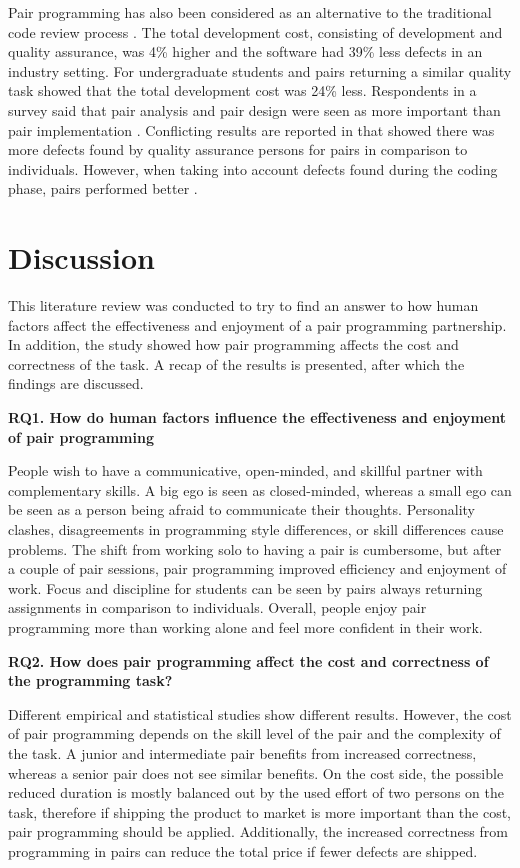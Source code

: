 \documentclass[conference]{IEEEtran}
\begin{document}
Pair programming has also been considered as an alternative to the traditional code review process \cite{10.1145/1159733.1159749}. The total development cost, consisting of development and quality assurance, was 4\% higher and the software had 39\% less defects in an industry setting. For undergraduate students and pairs returning a similar quality task showed that the total development cost was 24\% less. Respondents in a survey said that pair analysis and pair design were seen as more important than pair implementation \cite{Williams2000Strengthening}. Conflicting results are reported in \cite{1541842} that showed there was more defects found by quality assurance persons for pairs in comparison to individuals. However, when taking into account defects found during the coding phase, pairs performed better \cite{1541842}. 


\section{Discussion}

This literature review was conducted to try to find an answer to how human factors affect the effectiveness and enjoyment of a pair programming partnership. In addition, the study showed how pair programming affects the cost and correctness of the task. A recap of the results is presented, after which the findings are discussed. 

\textbf{RQ1. How do human factors influence the effectiveness and enjoyment of pair programming}
    
People wish to have a communicative, open-minded, and skillful partner with complementary skills. A big ego is seen as closed-minded, whereas a small ego can be seen as a person being afraid to communicate their thoughts. Personality clashes, disagreements in programming style differences, or skill differences cause problems. The shift from working solo to having a pair is cumbersome, but after a couple of pair sessions, pair programming improved efficiency and enjoyment of work. Focus and discipline for students can be seen by pairs always returning assignments in comparison to individuals. Overall, people enjoy pair programming more than working alone and feel more confident in their work.

    
\textbf{RQ2. How does pair programming affect the cost and correctness of the programming task?}

Different empirical and statistical studies show different results. However, the cost of pair programming depends on the skill level of the pair and the complexity of the task. A junior and intermediate pair benefits from increased correctness, whereas a senior pair does not see similar benefits. On the cost side, the possible reduced duration is mostly balanced out by the used effort of two persons on the task, therefore if shipping the product to market is more important than the cost, pair programming should be applied. Additionally, the increased correctness from programming in pairs can reduce the total price if fewer defects are shipped.
\end{document}
